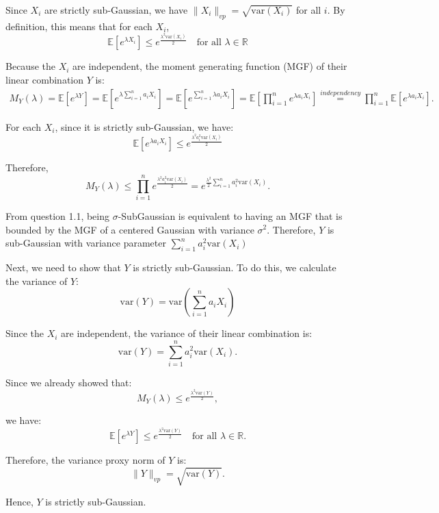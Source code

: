 \documentclass[a4 paper]{article}
\theoremstyle{boldStyle}
\theoremstyle{boldBlueStyle}
\theoremstyle{boldPurpleStyle}
\theoremstyle{boldRedStyle}
\begin{document}
\begin{enumerate}
Since \(X_i\) are strictly sub-Gaussian, we have \(\|X_i\|_{vp} = \sqrt{\mathrm{var}(X_i)}\) for all \(i\). By definition, this means that for each \(X_i\),
\[
\mathbb{E}[e^{\lambda X_i}] \leq e^{\frac{\lambda^2 \mathrm{var}(X_i)}{2}} \quad \text{for all } \lambda \in \mathbb{R}
\]

Because the \(X_i\) are independent, the moment generating function (MGF) of their linear combination \(Y\) is:
\begin{align*}
M_Y(\lambda) = \mathbb{E}[e^{\lambda Y}] = \mathbb{E}\left[e^{\lambda \sum_{i=1}^n a_i X_i}\right] = \mathbb{E}\left[e^{\sum_{i=1}^n \lambda a_i X_i}\right] = 
\mathbb{E}\left[ \prod_{i=1}^n e^ {\lambda a_i X_i}\right] \stackrel{independency}{=} \prod_{i=1}^n \mathbb{E}\left[e^{\lambda a_i X_i}\right].
\end{align*}

For each \(X_i\), since it is strictly sub-Gaussian, we have:
\[
\mathbb{E}\left[e^{\lambda a_i X_i}\right] \leq e^{\frac{\lambda^2 a_i^2 \mathrm{var}(X_i)}{2}}
\]

Therefore,
\[
M_Y(\lambda) \leq \prod_{i=1}^n e^{\frac{\lambda^2 a_i^2 \mathrm{var}(X_i)}{2}} = e^{\frac{\lambda^2}{2} \sum_{i=1}^n a_i^2 \mathrm{var}(X_i)}.
\]

From question 1.1, being $\sigma$-SubGaussian is equivalent to having an MGF that is bounded by the MGF of a centered Gaussian with variance $\sigma^2$. 
Therefore, \(Y\) is sub-Gaussian with variance parameter \(\sum_{i=1}^n a_i^2 \mathrm{var}(X_i)\)

Next, we need to show that \(Y\) is strictly sub-Gaussian. To do this, we calculate the variance of \(Y\):
\[
\mathrm{var}(Y) = \mathrm{var}\left(\sum_{i=1}^n a_i X_i\right)
\]

Since the \(X_i\) are independent, the variance of their linear combination is:
\[
\mathrm{var}(Y) = \sum_{i=1}^n a_i^2 \mathrm{var}(X_i).
\]

Since we already showed that:
\[
M_Y(\lambda) \leq e^{\frac{\lambda^2 \mathrm{var}(Y)}{2}},
\]

we have:
\[
\mathbb{E}[e^{\lambda Y}] \leq e^{\frac{\lambda^2 \mathrm{var}(Y)}{2}} \quad \text{for all } \lambda \in \mathbb{R}.
\]

Therefore, the variance proxy norm of \(Y\) is:
\[
\|Y\|_{vp} = \sqrt{\mathrm{var}(Y)}.
\]

Hence, \(Y\) is strictly sub-Gaussian.








\end{enumerate}
\end{document}
